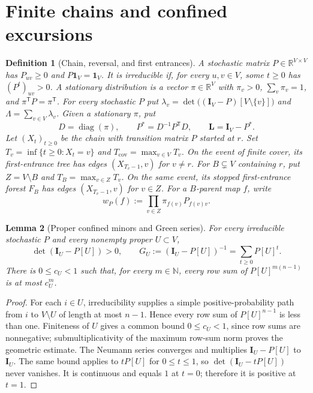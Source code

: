 \documentclass[11pt]{article}
\newtheorem{definition}{Definition}[section]
\newtheorem{lemma}[definition]{Lemma}
\newcommand{\R}{\mathbb R}
\newcommand{\one}{\mathbf 1}
\newcommand{\Id}{\mathbf I}
\newcommand{\Lmat}{\mathbf L}
\begin{document}
\section{Finite chains and confined excursions}

\begin{definition}[Chain, reversal, and first entrances]
\label{def:chain}
A stochastic matrix $P\in\R^{V\times V}$ has $P_{uv}\geq0$ and
$P\one_V=\one_V$. It is irreducible if, for every $u,v\in V$,
some $t\geq0$ has $(P^t)_{uv}>0$.
A stationary distribution is a vector $\pi\in\R^V$ with
$\pi_v>0$, $\sum_v\pi_v=1$, and $\pi^{\mathsf T}P=\pi^{\mathsf T}$.
For every stochastic $P$ put
$\lambda_v=\det\bigl((\Id_V-P)[V\setminus\{v\}]\bigr)$ and
$\Lambda=\sum_{v\in V}\lambda_v$. Given a stationary $\pi$, put
\begin{equation}\label{eq:reverse}
D=\operatorname{diag}(\pi),\qquad
P^*=D^{-1}P^{\mathsf T}D,\qquad
\Lmat=\Id_V-P^*.
\end{equation}
Let $(X_t)_{t\geq0}$ be the chain with transition matrix $P$
started at $r$. Set
$T_v=\inf\{t\geq0:X_t=v\}$ and
$T_{\mathrm{cov}}=\max_{v\in V}T_v$.
On the event of finite cover, its first-entrance tree has edges
$(X_{T_v-1},v)$ for $v\neq r$.
For $B\subsetneq V$ containing $r$, put $Z=V\setminus B$ and
$T_B=\max_{v\in Z}T_v$. On the same event, its stopped
first-entrance forest $F_B$ has edges $(X_{T_v-1},v)$ for $v\in Z$.
For a $B$-parent map $f$, write
\begin{equation}\label{eq:forest-weight}
w_P(f):=\prod_{v\in Z}\pi_{f(v)}P_{f(v)v}.
\end{equation}
\end{definition}

\begin{lemma}[Proper confined minors and Green series]
\label{lem:confined}
For every irreducible stochastic $P$ and every nonempty proper
$U\subset V$,
\begin{equation}\label{eq:confined}
\det(\Id_U-P[U])>0,
\qquad
G_U:=(\Id_U-P[U])^{-1}=\sum_{t\geq0}P[U]^t.
\end{equation}
There is $0\leq c_U<1$ such that, for every $m\in\mathbb N$,
every row sum of $P[U]^{m(n-1)}$ is at most $c_U^m$.
\end{lemma}
\begin{proof}
For each $i\in U$, irreducibility supplies a simple
positive-probability path from $i$ to $V\setminus U$ of length
at most $n-1$. Hence every row sum of $P[U]^{n-1}$ is less
than one. Finiteness of $U$ gives a common bound
$0\leq c_U<1$, since row sums are nonnegative;
submultiplicativity of the maximum row-sum norm proves the
geometric estimate. The Neumann series converges and multiplies
$\Id_U-P[U]$ to $\Id_U$.
The same bound applies to $tP[U]$ for $0\leq t\leq1$, so
$\det(\Id_U-tP[U])$ never vanishes. It is continuous and equals
$1$ at $t=0$; therefore it is positive at $t=1$.
\end{proof}
\end{document}

